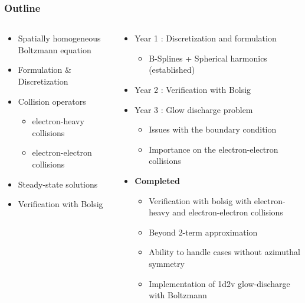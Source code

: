 \documentclass[mathserif, aspectratio=169]{beamer}
\begin{document}
\begin{frame}
	\frametitle{Outline}
	\begin{columns}
		\begin{column}{0.4\textwidth}
				\begin{itemize}
				\item Spatially homogeneous Boltzmann equation
				\item Formulation \& Discretization
				\item Collision operators
				\begin{itemize}
					\item electron-heavy collisions
					\item electron-electron collisions
				\end{itemize}
				\item Steady-state solutions
				\item Verification with Bolsig
			\end{itemize}
		\end{column}
		\begin{column}{0.6\textwidth}
			\begin{itemize}
				\item Year 1 : Discretization and formulation 
				\begin{itemize}
					\item B-Splines + Spherical harmonics (established)
				\end{itemize}	
				\item Year 2 : Verification with Bolsig
				\item Year 3 : Glow discharge problem
					\begin{itemize}
						\item Issues with the boundary condition
						\item Importance on the electron-electron collisions
					\end{itemize}
				\item \textbf{Completed}
				\begin{itemize}
					\item Verification with bolsig with electron-heavy and electron-electron collisions
					\item Beyond 2-term approximation
					\item Ability to handle cases without azimuthal symmetry
					\item Implementation of 1d2v glow-discharge with Boltzmann  
				\end{itemize}\textbf{}
			\end{itemize}
		\end{column}
	\end{columns}


\end{frame}
\end{document}
